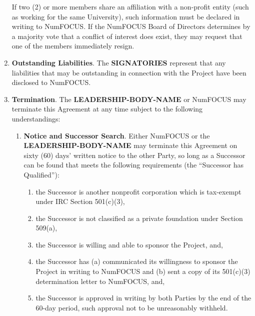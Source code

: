\documentclass[english,letterpaper,12pt]{article}
\newcommand{\signatories}{\textbf{SIGNATORIES}}
\newcommand{\leadershipbody}{\textbf{LEADERSHIP-BODY-NAME}}
\begin{document}
\begin{enumerate}[label=\arabic*.,ref=\S~\arabic*]
  If two (2) or more members share an affiliation with a non-profit entity
  (such as working for the same University), such information must be declared
  in writing to NumFOCUS. If the NumFOCUS Board of Directors determines by a
  majority vote that a conflict of interest does exist, they may request that
  one of the members immediately resign.

\item \textbf{Outstanding Liabilities}. The \signatories{} represent that any
  liabilities that may be outstanding in connection with the Project have been
  disclosed to NumFOCUS.

\item \textbf{Termination}. \label{Termination} The \leadershipbody{} or
  NumFOCUS may terminate this Agreement at any time subject to the following
  understandings:

\begin{enumerate}[label=\alph*.,ref=\theenumi(\arabic*)]

\item \textbf{Notice and Successor Search}. Either NumFOCUS or the
  \leadershipbody{} may terminate this Agreement on sixty (60) days' written
  notice to the other Party, so long as a Successor can be found that meets the
  following requirements (the ``Successor has Qualified''):


\begin{enumerate}[label=\roman*.,ref=\theenumi(\alph{enumii})(\roman*)]
  
\item the Successor is another nonprofit corporation which is tax-exempt under
  IRC Section 501(c)(3),
  
\item the Successor is not classified as a private foundation under Section
  509(a),
  
\item the Successor is willing and able to sponsor the Project, and,
  
\item the Successor has (a) communicated its willingness to sponsor the Project
  in writing to NumFOCUS and (b) sent a copy of its 501(c)(3) determination
  letter to NumFOCUS, and,
  
\item the Successor is approved in writing by both Parties by the end of the
  60-day period, such approval not to be unreasonably withheld.
  
\end{enumerate}


\end{enumerate}
\end{enumerate}
\end{document}
